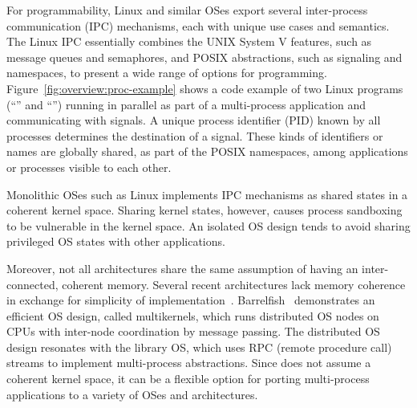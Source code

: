 For programmability, Linux and similar OSes export several inter-process communication (IPC) mechanisms,
each with unique use cases and semantics.
The Linux IPC essentially combines the UNIX System V features, such as message queues and semaphores,
and POSIX abstractions, such as signaling and namespaces,
to present a wide range of options for programming.
Figure~\ref{fig:overview:proc-example} shows a code example of
two Linux programs (``'' and ``'')
running in parallel as part of a multi-process application and communicating with signals.
A unique process identifier (PID)
known by all processes determines the destination of a signal.
These kinds of identifiers or names are globally shared, as part of the POSIX namespaces,
among applications or processes visible to each other.




Monolithic OSes such as Linux implements IPC mechanisms as shared states in a coherent kernel space.
Sharing kernel states, however, causes process sandboxing
to be vulnerable in the kernel space.
An isolated OS design tends to avoid sharing privileged OS states with other applications.


Moreover, not all architectures share the same assumption of having an inter-connected, coherent memory.
Several recent architectures lack memory coherence
in exchange for simplicity of implementation~\cite{gschwind2007,cascaval2002evaluation}.
Barrelfish~\cite{baumann09barrelfish} demonstrates an efficient OS design, called multikernels, which runs distributed OS nodes on CPUs with inter-node coordination by message passing.
The distributed OS design resonates with the \graphene{} library OS, which uses RPC (remote procedure call) streams to implement multi-process abstractions.
Since \graphene{} does not assume a coherent kernel space, it can be a flexible option
for porting multi-process applications to a variety of OSes and architectures.



